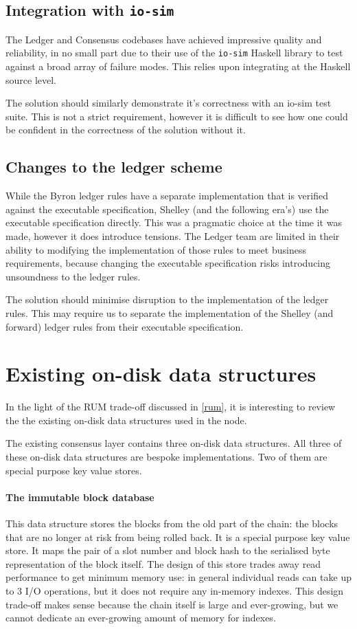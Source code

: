 \documentclass[11pt,a4paper]{article}
\begin{document}
\subsection{Integration with {\tt io-sim}}
\label{io-sim}
The Ledger and Consensus codebases have achieved impressive quality
and reliability, in no small part due to their use of the {\tt io-sim}
Haskell library to test against a broad array of failure modes. This
relies upon integrating at the Haskell source level.

The solution should similarly demonstrate it's correctness with an io-sim test
suite. This is not a strict requirement, however it is difficult to see how one
could be confident in the correctness of the solution without it.

\subsection{Changes to the ledger scheme}

While the Byron ledger rules have
a separate implementation that is verified against the executable specification,
Shelley (and the following era's) use the executable specification directly.
This was a pragmatic choice at the time it was made, however it does introduce
tensions. The Ledger team are limited in their ability to modifying the
implementation of those rules to meet business requirements, because changing
the executable specification risks introducing unsoundness to the ledger rules.

The solution should minimise disruption to the implementation of the ledger
rules. This may require us to separate the implementation of the Shelley (and
forward) ledger rules from their executable specification.


\section{Existing on-disk data structures}

In the light of the RUM trade-off discussed in \cref{rum}, it is interesting to
review the the existing on-disk data structures used in the node.

The existing consensus layer contains three on-disk data structures. All three
of these on-disk data structures are bespoke implementations. Two of them are
special purpose key value stores.

\paragraph{The immutable block database}
This data structure stores the blocks from the old part of the chain: the
blocks that are no longer at risk from being rolled back. It is a special
purpose key value store. It maps the pair of a slot number and block hash to
the serialised byte representation of the block itself. The design of this
store trades away read performance to get minimum memory use: in general
individual reads can take up to 3 I/O operations, but it does not require any
in-memory indexes. This design trade-off makes sense because the chain itself
is large and ever-growing, but we cannot dedicate an ever-growing amount of
memory for indexes.
\end{document}
